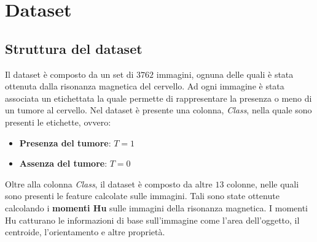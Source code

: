 \chapter{Dataset}
\section{Struttura del dataset}
Il dataset è composto da un set di $3762$ immagini, ognuna delle quali è stata
ottenuta dalla risonanza magnetica del cervello. Ad ogni immagine è stata
associata un etichettata la quale permette di rappresentare la presenza o meno
di un tumore al cervello. Nel dataset è presente una colonna, \textit{Class},
nella quale sono presenti le etichette, ovvero:
\begin{itemize}
      \item \textbf{Presenza del tumore}: $T = 1$
      \item \textbf{Assenza del tumore}: $T = 0$
\end{itemize}

Oltre alla colonna \textit{Class}, il dataset è composto da altre $13$ colonne,
nelle quali sono presenti le feature calcolate sulle immagini. Tali sono state
ottenute calcolando i \textbf{momenti Hu} sulle immagini della risonanza magnetica.
I momenti Hu catturano le informazioni di base sull'immagine come l'area
dell'oggetto, il centroide, l'orientamento e altre proprietà.

